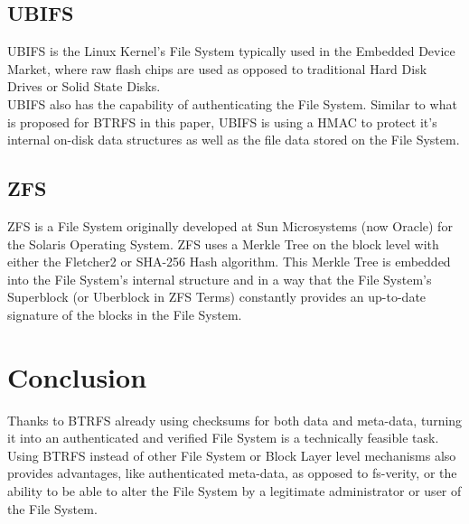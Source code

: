 \documentclass[10pt]{article}
\begin{document}
\subsection{UBIFS}
UBIFS\cite{UBIFS} is the Linux Kernel's File System typically used in the
Embedded Device Market, where raw flash chips are used as opposed to
traditional Hard Disk Drives or Solid State Disks.\\ UBIFS also has the
capability of authenticating the File System. Similar to what is proposed for
BTRFS in this paper, UBIFS is using a HMAC to protect it's internal on-disk
data structures as well as the file data stored on the File System.

\subsection{ZFS}
ZFS\cite{ZFS} is a File System originally developed at Sun Microsystems (now
Oracle) for the Solaris Operating System. ZFS uses a Merkle Tree\cite{ZFS} on
the block level with either the Fletcher2 or SHA-256 Hash algorithm. This
Merkle Tree is embedded into the File System's internal structure and in a
way that the File System's Superblock (or Uberblock in ZFS Terms) constantly
provides an up-to-date signature of the blocks in the File System.

\section{Conclusion}
Thanks to BTRFS already using checksums for both data and meta-data, turning
it into an authenticated and verified File System is a technically feasible
task.  Using BTRFS instead of other File System or Block Layer level
mechanisms also provides advantages, like authenticated meta-data, as opposed
to fs-verity, or the ability to be able to alter the File System by a
legitimate administrator or user of the File System.
\end{document}
